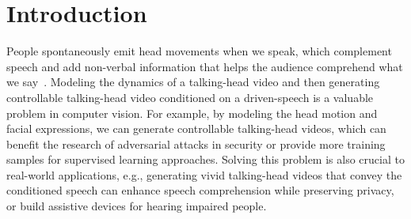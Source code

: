 \documentclass[runningheads]{llncs}
\providecommand{\CXu}[1]{\textcolor{red}{[{\bf #1}]}}
\begin{document}
\section{Introduction}
\label{sec:intro}



People spontaneously emit head movements when we speak, which complement speech and add non-verbal information that helps the audience comprehend what we say~\cite{cassell1999speech,ginosar2019gestures}. Modeling the dynamics of a talking-head video and then generating controllable talking-head video conditioned on a driven-speech is a valuable problem in computer vision. For example, by modeling the head motion and facial expressions, we can generate controllable talking-head videos, which can benefit the research of adversarial attacks in security or provide more training samples for supervised learning approaches. Solving this problem is also crucial to real-world applications, e.g., generating vivid talking-head videos that convey the conditioned speech can enhance speech comprehension while preserving privacy, or build assistive devices for hearing impaired people. 
\end{document}
